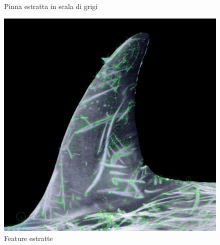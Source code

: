 \documentclass[a4paper,12pt]{report}
\begin{document}
\begin{figure}[H]
\begin{minipage}{0.3\textwidth}
        \caption{Pinna estratta in scala di grigi}
      \end{minipage}
      \begin{minipage}{0.3\textwidth}
        \centering
        \includegraphics[width=\textwidth]{assets/images/methods/porting/features_extraction/features.png}   
        \caption{Feature estratte}
      \end{minipage}
    \end{figure}
\end{document}
